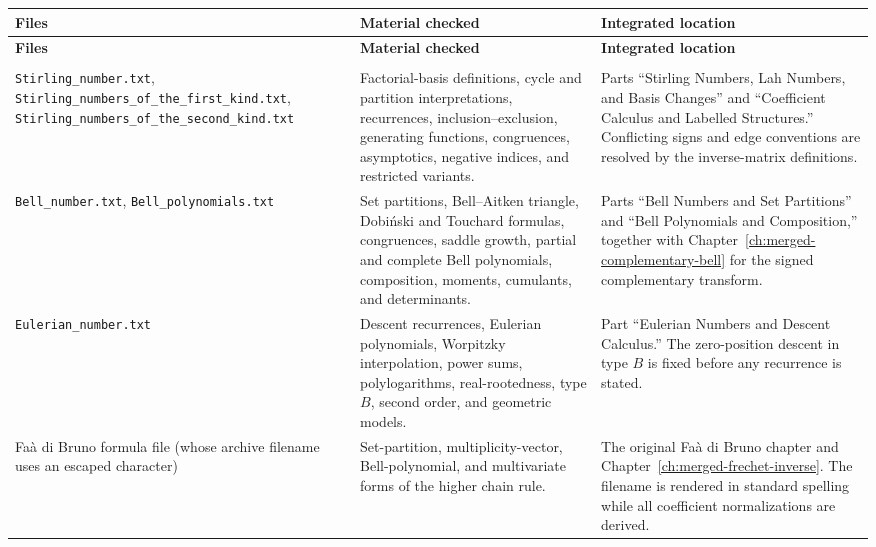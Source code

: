 \documentclass[11pt,a4paper,oneside,openany]{book}
\theoremstyle{definition}
\theoremstyle{remark}
\begin{document}
\renewcommand{\arraystretch}{1.15}
\begin{longtable}{>{\raggedright\arraybackslash}p{}
                  >{\raggedright\arraybackslash}p{}
                  >{\raggedright\arraybackslash}p{}}
\toprule
\textbf{Files} & \textbf{Material checked} & \textbf{Integrated location}\\
\midrule
\endfirsthead
\toprule
\textbf{Files} & \textbf{Material checked} & \textbf{Integrated location}\\
\midrule
\endhead
\midrule
\multicolumn{3}{r}{\small Continued on the next page}\\
\endfoot
\bottomrule
\endlastfoot

\nolinkurl{Stirling_number.txt},
\nolinkurl{Stirling_numbers_of_the_first_kind.txt},
\nolinkurl{Stirling_numbers_of_the_second_kind.txt}
& Factorial-basis definitions, cycle and partition interpretations, recurrences,
  inclusion--exclusion, generating functions, congruences, asymptotics, negative
  indices, and restricted variants.
& Parts ``Stirling Numbers, Lah Numbers, and Basis Changes'' and ``Coefficient
  Calculus and Labelled Structures.''  Conflicting signs and edge conventions are
  resolved by the inverse-matrix definitions.\\[1ex]

\nolinkurl{Bell_number.txt}, \nolinkurl{Bell_polynomials.txt}
& Set partitions, Bell--Aitken triangle, Dobi\'nski and Touchard formulas,
  congruences, saddle growth, partial and complete Bell polynomials, composition,
  moments, cumulants, and determinants.
& Parts ``Bell Numbers and Set Partitions'' and ``Bell Polynomials and
  Composition,'' together with Chapter~\ref{ch:merged-complementary-bell} for the
  signed complementary transform.\\[1ex]

\nolinkurl{Eulerian_number.txt}
& Descent recurrences, Eulerian polynomials, Worpitzky interpolation, power sums,
  polylogarithms, real-rootedness, type $B$, second order, and geometric models.
& Part ``Eulerian Numbers and Descent Calculus.''  The zero-position descent in
  type $B$ is fixed before any recurrence is stated.\\[1ex]

Fa\`a di Bruno formula file (whose archive filename uses an escaped character)
& Set-partition, multiplicity-vector, Bell-polynomial, and multivariate forms of
  the higher chain rule.
& The original Fa\`a di Bruno chapter and
  Chapter~\ref{ch:merged-frechet-inverse}.  The filename is rendered in standard
  spelling while all coefficient normalizations are derived.\\[1ex]


\end{longtable}
\end{document}
